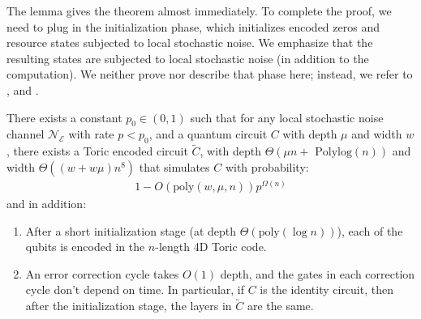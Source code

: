The lemma gives the theorem almost immediately. To complete the proof, we need to plug in the initialization phase, which initializes encoded zeros and resource states subjected to local stochastic noise. We emphasize that the resulting states are subjected to local stochastic noise (in addition to the computation). We neither prove nor describe that phase here; instead, we refer to \cite{grospellier:tel-03364419, gottesman2014faulttolerant, Fawzi_2018}, and \cite{nguyen2025quantumfaulttoleranceconstantspace}.
  \begin{theorem}
    \label{theorem:main}
    There exists a constant $p_{0} \in (0,1)$ such that for any local stochastic noise channel $\mathcal{N}_{\mathcal{E}}$ with rate $p < p_{0}$, and a quantum circuit $C$ with depth $\mu$ and width $w$, there exists a Toric encoded circuit $\tilde{C}$, with depth $\Theta(\mu n + \text{ Polylog}(n) )$ and width $\Theta((w + w\mu) n^{8} )$  that simulates $C$ with probability: 
\begin{equation*}
  \begin{split}
    1 -   O \left( \text{poly}(w,\mu,n) \right)  p^{\Omega(n)} 
  \end{split}
\end{equation*}
and in addition: 
\begin{enumerate}
  \item After a short initialization stage (at depth $\Theta( \text{poly}(\log n))$), each of the qubits is encoded in the $n$-length 4D Toric code.
  \item An error correction cycle takes $O(1)$ depth, and the gates in each correction cycle don't depend on time. In particular, if $C$ is the identity circuit, then after the initialization stage, the layers in $\tilde{C}$ are the same.
\end{enumerate}
  \end{theorem} 





